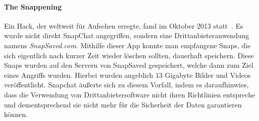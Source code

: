 \paragraph{The Snappening} Ein Hack, der weltweit f\"ur Aufsehen erregte, fand
im Oktober 2013 statt~\cite{sc_snappening}. Es wurde nicht direkt SnapChat
angegriffen, sondern eine Drittanbieteranwendung namens \emph{SnapSaved.com}.
Mithilfe dieser App konnte man empfangene Snaps, die sich eigentlich nach
kurzer Zeit wieder l\"oschen sollten, dauerhaft speichern. Diese Snaps wurden
auf den Servern von SnapSaved gespeichert, welche dann zum Ziel eines Angriffs
wurden. Hierbei wurden angeblich $13$ Gigabyte\cite{sc_snappening} Bilder und
Videos ver\"offentlicht. Snapchat \"au{\ss}erte sich zu diesem Vorfall, indem
es daraufhinwies, dass die Verwendung von Drittanbietersoftware nicht ihren
Richtlinien entspreche und dementsprechend sie nicht mehr f\"ur die Sicherheit
der Daten garantieren k\"onnen.
